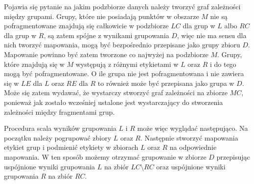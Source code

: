 Pojawia się pytanie na jakim podzbiorze danych należy tworzyć graf zależności między grupami. Grupy, które nie posiadają punktów w obszarze $ M $ nie są pofragmentowane znajdują się całkowicie w podzbiorze $ LC $ dla grup w $ L $ albo $ RC $ dla grup w $ R $, są zatem spójne z wynikami grupowania $ D $, więc nie ma sensu dla nich tworzyć mapowania, mogą być bezpośrednio przepisane jako grupy zbioru $ D $. Mapowanie powinno być zatem tworzone co najwyżej na podzbiorze $ M $. Grupy, które znajdują się w $ M $ występują z różnymi etykietami w $ L $ oraz $ R $ i do tego mogą być pofragmentowane. O ile grupa nie jest pofragmentowana i nie zawiera się w $ LE $ dla $ L $ oraz $ RE $ dla $ R $ to również może być przepisana jako grupa w $ D $. Może się zatem wydawać, że wystarczy stworzyć graf zależności na zbiorze $ MC $, ponieważ jak zostało wcześniej ustalone jest wystarczający do stworzenia zależności między fragmentami grup.\par
Procedura scala wyników grupowania $ L $ i $ R $ może więc wyglądać następująco. Na początku należy pogrupować zbiory $ L $ oraz $ R $. Następnie stworzyć mapowania etykiet grup i podmienić etykiety w zbiorach $ L $ oraz $ R $ na odpowiednie mapowania. W ten sposób możemy otrzymać grupowanie w zbiorze $ D $ przepisując uspójnione wyniki grupowania $ L $ na zbiór $ LC \setminus RC $ oraz uspójnione wyniki grupowania $ R $ na zbiór $ RC $.\par

